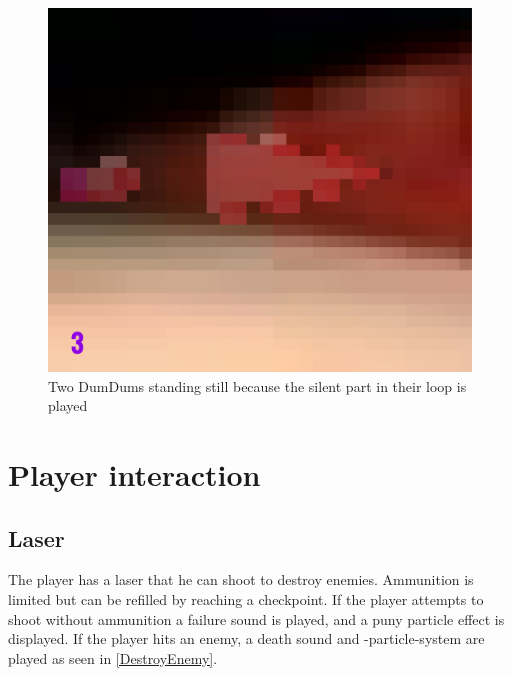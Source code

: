 \begin{figure}[p]
  \centering
  \includegraphics[height=0.85\textwidth]{images/game_systems/2DumDums.png}
  \caption{Two DumDums standing still because the silent part in their loop is played}
  \label{Beatmover}
\end{figure}


\newpage
\section{Player interaction}
\subsection{Laser}
The player has a laser that he can shoot to destroy enemies. Ammunition is limited but can be refilled by reaching a checkpoint. If the player attempts to shoot without ammunition a failure sound is played, and a puny particle effect is displayed. If the player hits an enemy, a death sound and -particle-system are played as seen in \cref{DestroyEnemy}.

